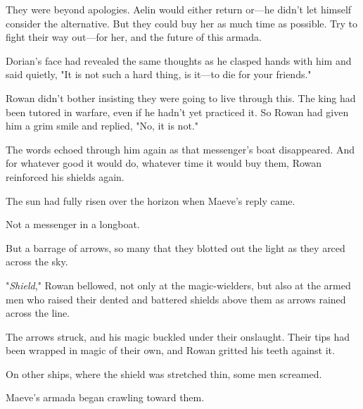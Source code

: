 They were beyond apologies.
Aelin would either return or---he didn't let himself consider the alternative.
But they could buy her as much time as possible.
Try to fight their way out---for her, and the future of this armada.

Dorian's face had revealed the same thoughts as he clasped hands with him and said quietly, "It is not such a hard thing, is it---to die for your friends."

Rowan didn't bother insisting they were going to live through this.
The king had been tutored in warfare, even if he hadn't yet practiced it.
So Rowan had given him a grim smile and replied, "No, it is not."

The words echoed through him again as that messenger's boat disappeared.
And for whatever good it would do, whatever time it would buy them, Rowan reinforced his shields again.

The sun had fully risen over the horizon when Maeve's reply came.

Not a messenger in a longboat.

But a barrage of arrows, so many that they blotted out the light as they arced across the sky.

"\emph{Shield}," Rowan bellowed, not only at the magic-wielders, but also at the armed men who raised their dented and battered shields above them as arrows rained across the line.

The arrows struck, and his magic buckled under their onslaught.
Their tips had been wrapped in magic of their own, and Rowan gritted his teeth against it.

On other ships, where the shield was stretched thin, some men screamed.

Maeve's armada began crawling toward them.
